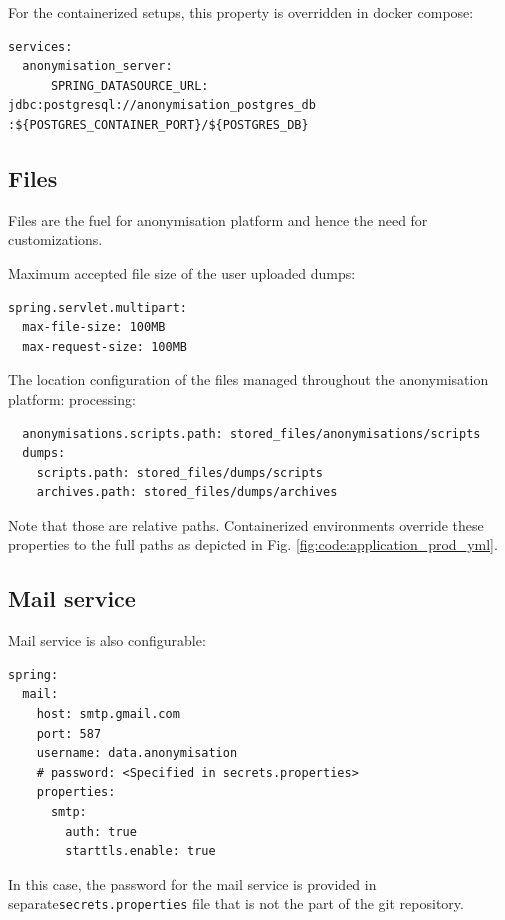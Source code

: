 \documentclass[a4paper,twoside,12pt]{book}
\begin{document}
For the containerized setups, this property is overridden in docker compose:

\begin{verbatim}
services:
  anonymisation_server:
      SPRING_DATASOURCE_URL:  jdbc:postgresql://anonymisation_postgres_db :${POSTGRES_CONTAINER_PORT}/${POSTGRES_DB}
\end{verbatim}

\subsection{Files}

Files are the fuel for anonymisation platform and hence the need for customizations.

Maximum accepted file size of the user uploaded dumps:
\begin{verbatim}
spring.servlet.multipart:
  max-file-size: 100MB
  max-request-size: 100MB
\end{verbatim}

The location configuration of the files managed throughout the anonymisation platform:
processing:
\begin{verbatim}
  anonymisations.scripts.path: stored_files/anonymisations/scripts
  dumps:
    scripts.path: stored_files/dumps/scripts
    archives.path: stored_files/dumps/archives
\end{verbatim}

Note that those are relative paths. Containerized environments override these properties to the full paths as depicted in Fig. \ref{fig:code:application_prod_yml}.



\subsection{Mail service}

Mail service is also configurable:
\begin{verbatim}
spring:
  mail:
    host: smtp.gmail.com
    port: 587
    username: data.anonymisation
    # password: <Specified in secrets.properties>
    properties:
      smtp:
        auth: true
        starttls.enable: true
\end{verbatim}
In this case, the password for the mail service is provided in separate\newline \verb|secrets.properties| file that is not the part of the git repository.
\end{document}
